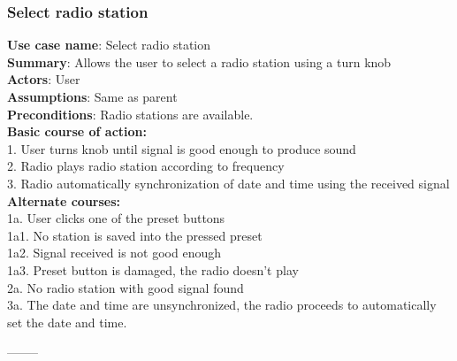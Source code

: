 \documentclass[11pt]{article}
\begin{document}
\subsubsection{Select radio station}
\textbf{Use case name}: Select radio station\\
\textbf{Summary}: Allows the user to select a radio station using a turn knob\\
\textbf{Actors}: User\\
\textbf{Assumptions}: Same as parent\\
\textbf{Preconditions}: Radio stations are available.\\
\textbf{Basic course of action:}\\
\hspace*{10mm}1. User turns knob until signal is good enough to produce sound\\
\hspace*{10mm}2. Radio plays radio station according to frequency\\
\hspace*{10mm}3. Radio automatically synchronization of date and time using the received signal\\
\textbf{Alternate courses: }\\
\hspace*{10mm}1a. User clicks one of the preset buttons\\
\hspace*{20mm}1a1. No station is saved into the pressed preset\\
\hspace*{20mm}1a2. Signal received is not good enough\\
\hspace*{20mm}1a3. Preset button is damaged, the radio doesn't play\\
\hspace*{10mm}2a. No radio station with good signal found\\
\hspace*{10mm}3a. The date and time are unsynchronized, the radio proceeds to automatically set the date and time.
\begin{center}--------\end{center}
\end{document}
